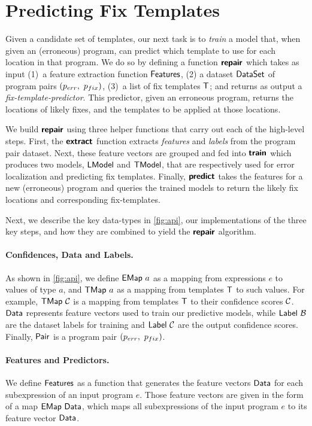 \section{Predicting Fix Templates}
\label{sec:templ-pred}

Given a candidate set of templates, our next task is to \emph{train} a model
that, when given an (erroneous) program, can predict which template to use for
each location in that program.
%
We do so by defining a function $\bm{\mathsf{repair}}$ which takes as input
%
(1)~a feature extraction function $\mathsf{Features}$,
%
(2) a dataset $\mathsf{DataSet}$ of program pairs $(p_{err},\ p_{fix})$,
%
(3)~a list of fix templates $\mathsf{T}$;
%
and returns as output a \emph{fix-template-predictor}. This predictor, given an
erroneous program, returns the locations of likely fixes, and the templates to
be applied at those locations.

We build $\bm{\mathsf{repair}}$ using three helper functions that carry out each of the
high-level steps.
%
First, the $\bm{\mathsf{extract}}$ function extracts \emph{features} and \emph{labels}
from the program pair dataset. Next, these feature vectors are grouped and fed
into $\bm{\mathsf{train}}$ which produces two models, $\mathsf{LModel}$ and $\mathsf{TModel}$, that are
respectively used for error localization and predicting fix templates.
%
Finally, $\bm{\mathsf{predict}}$ takes the features for a new (erroneous) program and
queries the trained models to return the likely fix locations and corresponding
fix-templates.

Next, we describe the key data-types in \autoref{fig:api}, our implementations
of the three key steps, and how they are combined to yield the $\bm{\mathsf{repair}}$
algorithm.

\paragraph{Confidences, Data and Labels.}
As shown in \autoref{fig:api}, we define $\mathsf{EMap}\ a$ as a mapping from
expressions $e$ to values of type $a$, and $\mathsf{TMap}\ a$ as a mapping from
templates $\mathsf{T}$ to such values. For example, $\mathsf{TMap}\ \mathcal{C}$ is a mapping from
templates $\mathsf{T}$ to their confidence scores $\mathcal{C}$. $\mathsf{Data}$ represents feature
vectors used to train our predictive models, while $\mathsf{Label}\ \mathcal{B}$ are the
dataset labels for training and $\mathsf{Label}\ \mathcal{C}$ are the output confidence
scores. Finally, $\mathsf{Pair}$ is a program pair $(p_{err},\ p_{fix})$.

\paragraph{Features and Predictors.}
We define $\mathsf{Features}$ as a function that generates the feature vectors
$\mathsf{Data}$ for each subexpression of an input program $e$. Those feature vectors
are given in the form of a map $\mathsf{EMap}\ \mathsf{Data}$, which maps all subexpressions
of the input program $e$ to its feature vector $\mathsf{Data}$.

